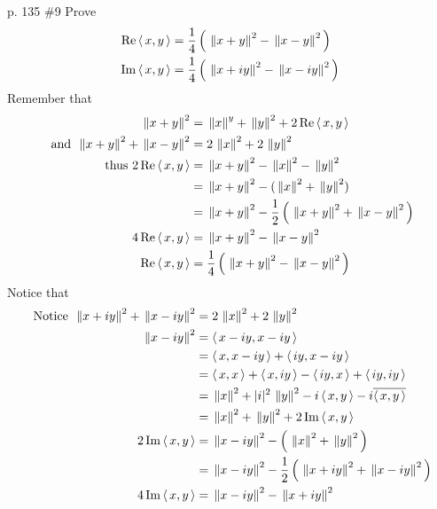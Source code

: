\documentclass[10pt,a4paper]{report}
\newcommand{\NORM}[1]{\,\left \Vert #1 \right \Vert}
\begin{document}
\noindent p. 135 \#9 Prove
\begin{align*}
	\RR \ABRACKET{x,y} &= \frac{1}{4}\PAREN{\NORM{x+y}^2-\NORM{x-y}^2} \\
	\IM \ABRACKET{x,y} &= \frac{1}{4}\PAREN{\NORM{x+iy}^2-\NORM{x-iy}^2} 
\end{align*} Remember that
\begin{align*}
	\NORM{x+y}^2 &= \NORM{x}^y + \NORM{y}^2 +2 \RR \ABRACKET{x,y}\\
	\text{ and } \NORM{x+y}^2+\NORM{x-y}^2 &= 2 \NORM{x}^2+2\NORM{y}^2 \\
	\text{ thus } 2 \RR \ABRACKET{x,y} &= \NORM{x+y}^2 - \NORM{x}^2 - \NORM{y}^2 \\
	&= \NORM{x+y}^2 - (\NORM{x}^2 + \NORM{y}^2) \\
	&= \NORM{x+y}^2 - \frac{1}{2}\PAREN{ \NORM{x+y}^2+\NORM{x-y}^2} \\
	4 \RR \ABRACKET{x,y} &= \NORM{x+y}^2-\NORM{x-y}^2 \\
	\RR \ABRACKET{x,y} &= \frac{1}{4}\PAREN{\NORM{x+y}^2-\NORM{x-y}^2} \\
\end{align*}Notice that 
\begin{align*}
	\text{ Notice } \NORM{x+iy}^2+\NORM{x-iy}^2 &= 2 \NORM{x}^2+2\NORM{y}^2\\
	\NORM{x-iy}^2 &= \ABRACKET{x-iy,x-iy}\\
		&= \ABRACKET{x,x-iy}+\ABRACKET{iy,x-iy} \\
		&= \ABRACKET{x,x} + \ABRACKET{x,iy} -\ABRACKET{iy,x}+\ABRACKET{iy,iy}\\
		&= \NORM{x}^2 + |i|^2\NORM{y}^2 -i\ABRACKET{x,y} -i\CONJ{\ABRACKET{x,y}} \\
		&= \NORM{x}^2 + \NORM{y}^2 + 2\IM\ABRACKET{x,y} \\
	2\IM\ABRACKET{x,y} &= \NORM{x-iy}^2 - \PAREN{\NORM{x}^2 + \NORM{y}^2} \\
		&= \NORM{x-iy}^2 - \frac{1}{2}\PAREN{\NORM{x+iy}^2+\NORM{x-iy}^2} \\
	4\IM\ABRACKET{x,y} &= \NORM{x-iy}^2 -\NORM{x+iy}^2\\
\end{align*}
\end{document}
